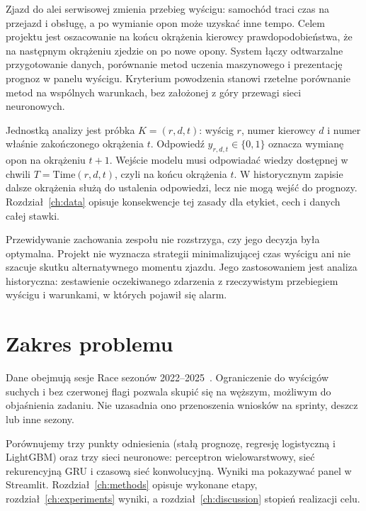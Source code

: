 \label{ch:intro}

Zjazd do alei serwisowej zmienia przebieg wyścigu: samochód traci czas
na przejazd i obsługę, a po wymianie opon może uzyskać inne tempo.
Celem projektu jest oszacowanie na końcu okrążenia kierowcy
prawdopodobieństwa, że na następnym okrążeniu zjedzie on po nowe opony.
System łączy odtwarzalne przygotowanie danych, porównanie metod
uczenia maszynowego i prezentację prognoz w panelu wyścigu.
Kryterium powodzenia stanowi rzetelne porównanie metod na wspólnych
warunkach, bez założonej z góry przewagi sieci neuronowych.

Jednostką analizy jest próbka $K=(r,d,t)$: wyścig $r$, numer kierowcy $d$
i numer właśnie zakończonego okrążenia $t$. Odpowiedź
$y_{r,d,t}\in\{0,1\}$ oznacza wymianę opon na okrążeniu $t+1$.
Wejście modelu musi odpowiadać wiedzy dostępnej w chwili
$T=\mathrm{Time}(r,d,t)$, czyli na końcu okrążenia $t$. W historycznym
zapisie dalsze okrążenia służą do ustalenia odpowiedzi, lecz nie
mogą wejść do prognozy. Rozdział~\ref{ch:data} opisuje konsekwencje
tej zasady dla etykiet, cech i danych całej stawki.

Przewidywanie zachowania zespołu nie rozstrzyga, czy jego decyzja była
optymalna. Projekt nie wyznacza strategii minimalizującej czas wyścigu
ani nie szacuje skutku alternatywnego momentu zjazdu. Jego zastosowaniem
jest analiza historyczna: zestawienie oczekiwanego zdarzenia
z rzeczywistym przebiegiem wyścigu i warunkami, w których pojawił się
alarm.

\section{Zakres problemu}

Dane obejmują sesje Race sezonów 2022--2025~\cite{project}. Ograniczenie
do wyścigów suchych i bez czerwonej flagi pozwala skupić się na węższym,
możliwym do objaśnienia zadaniu. Nie uzasadnia ono przenoszenia wniosków
na sprinty, deszcz lub inne sezony.

Porównujemy trzy punkty odniesienia (stałą prognozę, regresję logistyczną
i LightGBM) oraz trzy sieci neuronowe: perceptron wielowarstwowy, sieć
rekurencyjną GRU i czasową sieć konwolucyjną. Wyniki ma pokazywać panel
w Streamlit. Rozdział~\ref{ch:methods} opisuje wykonane etapy,
rozdział~\ref{ch:experiments} wyniki, a rozdział~\ref{ch:discussion}
stopień realizacji celu.
